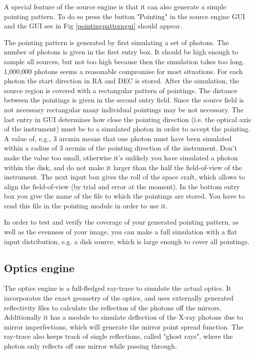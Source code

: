 A special feature of the source engine is that it can also generate a simple pointing pattern. To do so press the button "Pointing" in the source engine GUI and the GUI see in Fig \ref{pointingpatterngui} should appear. 

The pointing pattern is generated by first simulating a set of photons. The number of photons is given in the first entry box. It should be high enough to sample all sources, but not too high because then the simulation takes too long. 1,000,000 photons seems a reasonable compromise for most situations. For each photon the start direction in RA and DEC is stored. After the simulation, the source region is covered with a rectangular pattern of pointings. The distance between the pointings is given in the second entry field. Since the source field is not necessary rectangular many individual pointings may be not necessary. The last entry in GUI determines how close the pointing direction (i.e. the optical axis of the instrument) must be to a simulated photon in order to accept the pointing. A value of, e.g., 3 arcmin means that one photon must have been simulated within a radius of 3 arcmin of the pointing direction of the instrument. Don't make the value too small, otherwise it's unlikely you have simulated a photon within the disk, and do not make it larger than the half the field-of-view of the instrument.
The next input box gives the roll of the space craft, which allows to align the field-of-view (by trial and error at the moment).  
In the bottom entry box you give the name of the file to which the pointings are stored. You have to read this file in the pointing module in order to use it. 

In order to test and verify the coverage of your generated pointing pattern, as well as the evenness of your image, you can make a full simulation with a flat input distribution, e.g. a disk source, which is large enough to cover all pointings.



\subsection{Optics engine}
The optics engine is a full-fledged ray-trace to simulate the actual optics. It incorporates the exact geometry of the optics, and uses externally generated reflectivity files to calculate the reflection of the photons off the mirrors. Additionally it has a module to simulate deflection of the X-ray photons due to mirror imperfections, which will generate the mirror point spread function. The ray-trace also keeps track of single reflections, called "ghost rays", where the photon only reflects off one mirror while passing through.

